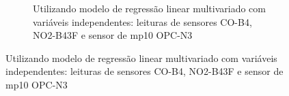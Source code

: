 \begin{figure}[h]
\begin{subfigure}{0.49\textwidth}
        \caption{Utilizando modelo de regressão linear multivariado com variáveis independentes: leituras de sensores CO-B4, NO2-B43F e sensor de \acrshort{mp10} OPC-N3}
        \label{fig:data-co-no2-pm10-reference-NO2-corr-RF}
    \end{subfigure}
\end{figure}